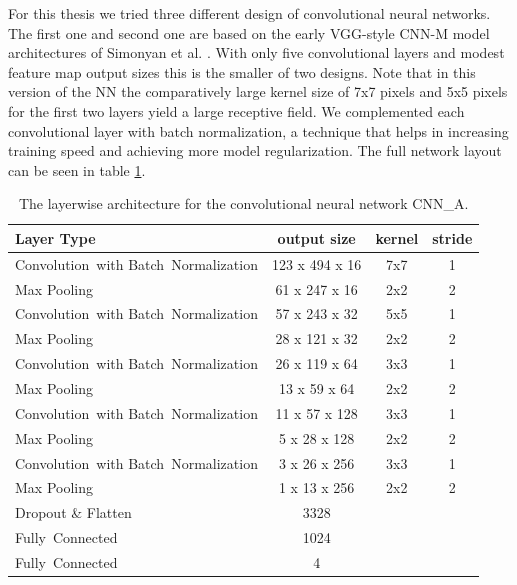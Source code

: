For this thesis we tried three different design of convolutional neural networks. The first one and second one are based on the early VGG-style CNN-M model architectures of Simonyan et al. \cite{Chatfield14}. With only five convolutional layers and modest feature map output sizes this is the smaller of two designs. Note that in this version of the NN the comparatively large kernel size of 7x7 pixels and 5x5 pixels for the first two layers yield a large receptive field. We complemented each convolutional layer with batch normalization\cite{ioffe2015batch}, a technique that helps in increasing training speed and achieving more model regularization. The full network layout can be seen in table \ref{tab:layers_CNN_A}.


 \begin{table}[]
  \centering
  \begin{tabularx}{\textwidth}{Xccc}
  \toprule
Layer Type                                          & output size    & kernel & stride  \\ \midrule
\mbox{Convolution with} \mbox{Batch Normalization}  & 123 x 494 x 16 & 7x7    & 1       \\ 
Max Pooling                                         & 61 x 247 x 16  & 2x2    & 2       \\ 
\mbox{Convolution with} \mbox{Batch Normalization}  & 57 x 243 x 32  & 5x5    & 1       \\ 
Max Pooling                                         & 28 x 121 x 32  & 2x2    & 2       \\ 
\mbox{Convolution with} \mbox{Batch Normalization}  & 26 x 119 x 64  & 3x3    & 1       \\ 
Max Pooling                                         & 13 x 59 x 64   & 2x2    & 2       \\ 
\mbox{Convolution with} \mbox{Batch Normalization}  & 11 x 57 x 128  & 3x3    & 1       \\ 
Max Pooling                                         & 5 x 28 x 128   & 2x2    & 2       \\ 
\mbox{Convolution with} \mbox{Batch Normalization}  & 3 x 26 x 256   & 3x3    & 1       \\ 
Max Pooling                                         & 1 x 13 x 256   & 2x2    & 2       \\ 
Dropout \& Flatten                                  & 3328           &        &         \\ 
\mbox{Fully Connected}                              & 1024           &        &         \\ 
\mbox{Fully Connected}                              & 4              &        &         \\ 
  \bottomrule
  \end{tabularx}
  \caption{The layerwise architecture for the convolutional neural network CNN\_A.}
  \label{tab:layers_CNN_A}
  \end{table}


